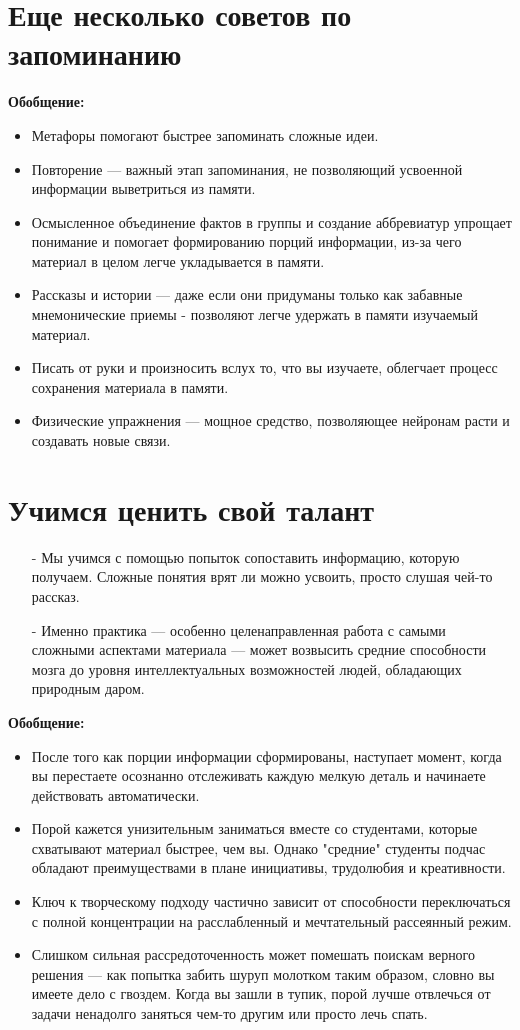 \documentclass{article}
\begin{document}
\section{Еще несколько советов по запоминанию}
\textbf{Обобщение:}
\begin{itemize}
\item Метафоры помогают быстрее запоминать сложные идеи.
\item Повторение --- важный этап запоминания, не позволяющий усвоенной информации выветриться из памяти.
\item Осмысленное объединение фактов в группы и создание аббревиатур упрощает понимание и помогает формированию порций информации, из-за чего материал в целом легче укладывается в памяти.
\item Рассказы и истории --- даже если они придуманы только как забавные мнемонические приемы - позволяют легче удержать в памяти изучаемый материал.
\item Писать от руки и произносить вслух то, что вы изучаете, облегчает процесс сохранения материала в памяти.
\item Физические упражнения --- мощное средство, позволяющее нейронам расти и создавать новые связи.
\end{itemize}

\section{Учимся ценить свой талант}
\begin{itemize}
\item[-] Мы учимся с помощью попыток сопоставить информацию, которую получаем. Сложные понятия врят ли можно усвоить, просто слушая чей-то рассказ.
\item[-] Именно практика --- особенно целенаправленная работа с самыми сложными аспектами материала --- может возвысить средние способности мозга до уровня интеллектуальных возможностей людей, обладающих природным даром.
\end{itemize}
\textbf{Обобщение:}
\begin{itemize}
\item После того как порции информации сформированы, наступает момент, когда вы перестаете осознанно отслеживать каждую мелкую деталь и начинаете действовать автоматически.
\item Порой кажется унизительным заниматься вместе со студентами, которые схватывают материал быстрее, чем вы. Однако "средние" студенты подчас обладают преимуществами в плане инициативы, трудолюбия и креативности.
\item Ключ к творческому подходу частично зависит от способности переключаться с полной концентрации на расслабленный и мечтательный рассеянный режим.
\item Слишком сильная рассредоточенность может помешать поискам верного решения --- как попытка забить шуруп молотком таким образом, словно вы имеете дело с гвоздем. Когда вы зашли в тупик, порой лучше отвлечься от задачи ненадолго заняться чем-то другим или просто лечь спать.
\end{itemize}
\end{document}
